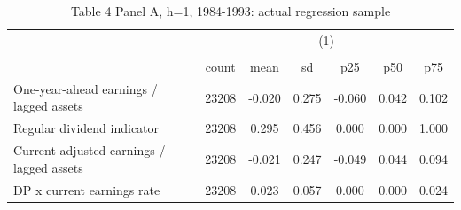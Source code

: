 \begin{table}[htbp]\centering
\def\sym#1{\ifmmode^{#1}\else\(^{#1}\)\fi}
\caption{Table 4 Panel A, h=1, 1984-1993: actual regression sample}
\begin{tabular}{l*{1}{cccccc}}
\hline\hline
                    &\multicolumn{6}{c}{(1)}                                                      \\
                    &\multicolumn{6}{c}{}                                                         \\
                    &       count&        mean&          sd&         p25&         p50&         p75\\
\hline
One-year-ahead earnings / lagged assets&       23208&      -0.020&       0.275&      -0.060&       0.042&       0.102\\
Regular dividend indicator&       23208&       0.295&       0.456&       0.000&       0.000&       1.000\\
Current adjusted earnings / lagged assets&       23208&      -0.021&       0.247&      -0.049&       0.044&       0.094\\
DP x current earnings rate&       23208&       0.023&       0.057&       0.000&       0.000&       0.024\\
\hline\hline
\end{tabular}
\end{table}
